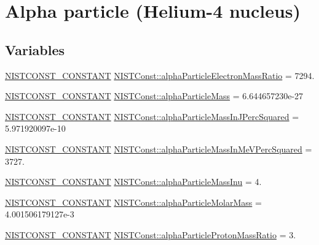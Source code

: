 \hypertarget{group___n_i_s_t_const-_alpha}{}\section{Alpha particle (Helium-\/4 nucleus)}
\label{group___n_i_s_t_const-_alpha}
\subsection*{Variables}
\begin{DoxyCompactItemize}
\item 
\mbox{\hyperlink{_n_i_s_t_const_8hpp_a2b0fc1d7452373f816175dd86ce26729}{N\+I\+S\+T\+C\+O\+N\+S\+T\+\_\+\+C\+O\+N\+S\+T\+A\+NT}} \mbox{\hyperlink{group___n_i_s_t_const-_alpha_ga20712605100e76dda5a323841c7d34b9}{N\+I\+S\+T\+Const\+::alpha\+Particle\+Electron\+Mass\+Ratio}} = 7294.
\item 
\mbox{\hyperlink{_n_i_s_t_const_8hpp_a2b0fc1d7452373f816175dd86ce26729}{N\+I\+S\+T\+C\+O\+N\+S\+T\+\_\+\+C\+O\+N\+S\+T\+A\+NT}} \mbox{\hyperlink{group___n_i_s_t_const-_alpha_ga614db65782dec906f97681c209cc395f}{N\+I\+S\+T\+Const\+::alpha\+Particle\+Mass}} = 6.\+644657230e-\/27
\item 
\mbox{\hyperlink{_n_i_s_t_const_8hpp_a2b0fc1d7452373f816175dd86ce26729}{N\+I\+S\+T\+C\+O\+N\+S\+T\+\_\+\+C\+O\+N\+S\+T\+A\+NT}} \mbox{\hyperlink{group___n_i_s_t_const-_alpha_gabf25739fe8b5745870581b150ed03e57}{N\+I\+S\+T\+Const\+::alpha\+Particle\+Mass\+In\+J\+Perc\+Squared}} = 5.\+971920097e-\/10
\item 
\mbox{\hyperlink{_n_i_s_t_const_8hpp_a2b0fc1d7452373f816175dd86ce26729}{N\+I\+S\+T\+C\+O\+N\+S\+T\+\_\+\+C\+O\+N\+S\+T\+A\+NT}} \mbox{\hyperlink{group___n_i_s_t_const-_alpha_ga76e0b9c7ad08a1100b5b358560ab7adb}{N\+I\+S\+T\+Const\+::alpha\+Particle\+Mass\+In\+Me\+V\+Perc\+Squared}} = 3727.
\item 
\mbox{\hyperlink{_n_i_s_t_const_8hpp_a2b0fc1d7452373f816175dd86ce26729}{N\+I\+S\+T\+C\+O\+N\+S\+T\+\_\+\+C\+O\+N\+S\+T\+A\+NT}} \mbox{\hyperlink{group___n_i_s_t_const-_alpha_gabece6c12566a76b12a7d4c14f7020afb}{N\+I\+S\+T\+Const\+::alpha\+Particle\+Mass\+Inu}} = 4.
\item 
\mbox{\hyperlink{_n_i_s_t_const_8hpp_a2b0fc1d7452373f816175dd86ce26729}{N\+I\+S\+T\+C\+O\+N\+S\+T\+\_\+\+C\+O\+N\+S\+T\+A\+NT}} \mbox{\hyperlink{group___n_i_s_t_const-_alpha_gac911c3ca9fffdf86ecaa4c33d20122f5}{N\+I\+S\+T\+Const\+::alpha\+Particle\+Molar\+Mass}} = 4.\+001506179127e-\/3
\item 
\mbox{\hyperlink{_n_i_s_t_const_8hpp_a2b0fc1d7452373f816175dd86ce26729}{N\+I\+S\+T\+C\+O\+N\+S\+T\+\_\+\+C\+O\+N\+S\+T\+A\+NT}} \mbox{\hyperlink{group___n_i_s_t_const-_alpha_gaa1225a01fd42754d96e9dffd7982c89d}{N\+I\+S\+T\+Const\+::alpha\+Particle\+Proton\+Mass\+Ratio}} = 3.
\end{DoxyCompactItemize}


